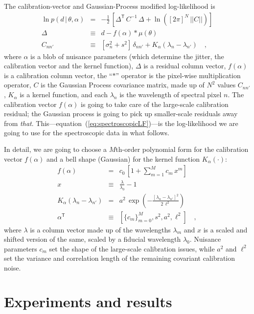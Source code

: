 \documentclass[12pt, letterpaper, preprint]{aastex}
\newcommand{\transpose}[1]{{#1}^{\!\mathsf T}}
\newcommand{\given}{\,|\,}
\renewcommand{\det}[1]{||{#1}||}
\begin{document}
The calibration-vector and Gaussian-Process modified log-likelihood is
\begin{eqnarray}\label{eq:spectroscopicLF}
\ln p(d\given\theta,\alpha) &=& -\frac{1}{2}\,\left[\transpose{\Delta}\,C^{-1}\,\Delta + \ln([2\pi]^N\,\det{C}) \right]
\\
\Delta &\equiv& d - f(\alpha)\ast\mu(\theta)
\\
C_{nn'} &\equiv& [\sigma_n^2 + s^2]\,\delta_{nn'} + K_\alpha(\lambda_n - \lambda_{n'})
\quad ,
\end{eqnarray}
where $\alpha$ is a blob of nuisance parameters
(which determine the jitter, the calibration vector and the kernel function),
$\Delta$ is a residual column vector,
$f(\alpha)$ is a calibration column vector,
the ``$\ast$'' operator is the pixel-wise multiplication operator,
$C$ is the Gaussian Process covariance matrix,
made up of $N^2$ values $C_{nn'}$,
$K_\alpha$ is a kernel function,
and each $\lambda_n$ is the wavelength of spectral pixel $n$.
The calibration vector $f(\alpha)$ is going to take care of the
large-scale calibration residual; the Gaussian process is going to
pick up smaller-scale residuals away from \emph{that}.
This---equation~(\ref{eq:spectroscopicLF})---is the log-likelihood we
are going to use for the spectroscopic data in what follows.

In detail, we are going to choose a $M$th-order polynomial form for
the calibration vector $f(\alpha)$ and a bell shape (Gaussian) for the
kernel function $K_\alpha(\cdot)$:
\begin{eqnarray}\displaystyle
f(\alpha) &=& c_0\,[1 + \sum_{m=1}^M c_m\,x^m]
\\
x &\equiv& \frac{\lambda}{\lambda_0} - 1
\\
K_\alpha(\lambda_n - \lambda_{n'}) &=& a^2\,\exp(-\frac{[\lambda_n - \lambda_{n'}]^2}{2\,\ell^2})
\\
\transpose{\alpha} &\equiv& \left[ \{c_m\}_{m=0}^M, s^2, a^2, \ell^2 \right]
\quad ,
\end{eqnarray}
where $\lambda$ is a column vector made up of the wavelengths $\lambda_m$
and $x$ is a scaled and shifted version of the same,
scaled by a fiducial wavelength $\lambda_0$.
Nuisance parameters $c_m$ set the shape of the large-scale calibration
issues, while $a^2$ and $\ell^2$ set the variance and correlation
length of the remaining covariant calibration noise.

\section{Experiments and results}
\end{document}
